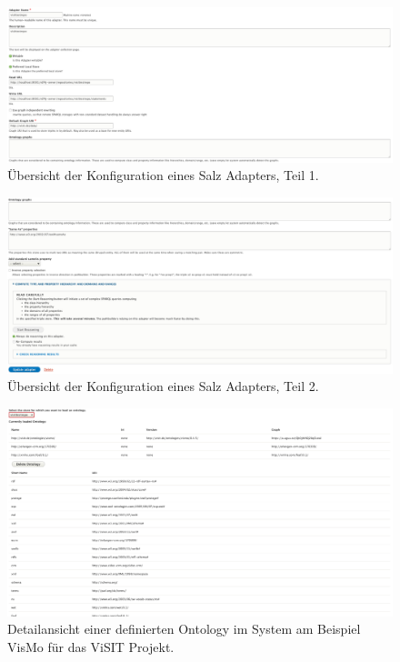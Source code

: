 \begin{figure}
    \includegraphics[width=1.0\textwidth,height=0.4\textwidth]{Figures/berndl/adapter1}
    \caption{\label{fig:adapter1} Übersicht der Konfiguration eines \wisski Salz Adapters, Teil 1.}
\end{figure}

\begin{figure}
    \includegraphics[width=1.0\textwidth,height=0.4\textwidth]{Figures/berndl/adapter3}
    \caption{\label{fig:adapter2} Übersicht der Konfiguration eines \wisski Salz Adapters, Teil 2.}
\end{figure}

\begin{figure}
    \includegraphics[width=1.0\textwidth,height=0.4\textwidth]{Figures/berndl/wisskiontology}
    \caption{\label{fig:wisskiontology} Detailansicht einer definierten Ontology im \wisski System am Beispiel VisMo für das ViSIT Projekt.}
\end{figure}

